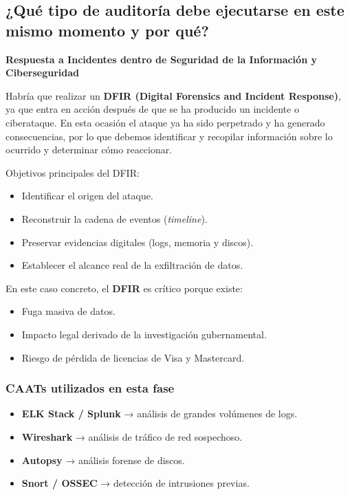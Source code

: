 \documentclass[11pt,a4paper]{article}
\begin{document}
\subsection{¿Qué tipo de auditoría debe ejecutarse en este mismo momento y por qué?}

\textbf{Respuesta a Incidentes dentro de Seguridad de la Información y Ciberseguridad}

Habría que realizar un \textbf{DFIR (Digital Forensics and Incident Response)}, ya que entra en acción después de que se ha producido un incidente o ciberataque. En esta ocasión el ataque ya ha sido perpetrado y ha generado consecuencias, por lo que debemos identificar y recopilar información sobre lo ocurrido y determinar cómo reaccionar.

\begin{tcolorbox}
Objetivos principales del DFIR:
\end{tcolorbox}

\begin{itemize}
    \item Identificar el origen del ataque.
    \item Reconstruir la cadena de eventos (\textit{timeline}).
    \item Preservar evidencias digitales (logs, memoria y discos).
    \item Establecer el alcance real de la exfiltración de datos.
\end{itemize}

En este caso concreto, el \textbf{DFIR} es crítico porque existe:

\begin{itemize}
    \item Fuga masiva de datos.
    \item Impacto legal derivado de la investigación gubernamental.
    \item Riesgo de pérdida de licencias de Visa y Mastercard.
\end{itemize}

\subsubsection*{CAATs utilizados en esta fase}

\begin{itemize}
    \item \textbf{ELK Stack / Splunk} → análisis de grandes volúmenes de logs.
    \item \textbf{Wireshark} → análisis de tráfico de red sospechoso.
    \item \textbf{Autopsy} → análisis forense de discos.
    \item \textbf{Snort / OSSEC} → detección de intrusiones previas.
\end{itemize}
\end{document}
